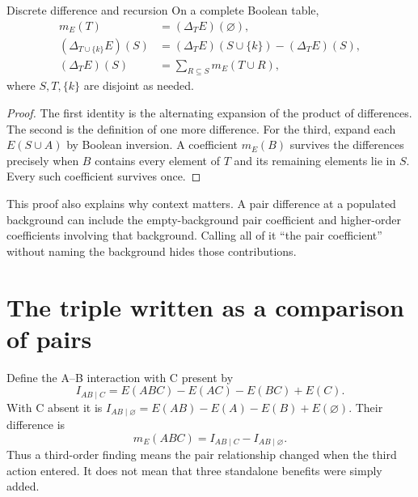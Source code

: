 \begin{theorem}{Discrete difference and recursion}\label{thm:recursion}
On a complete Boolean table,
\begin{align}
 m_E(T)&=(\Delta_TE)(\varnothing),\label{eq:mobius-difference}\\
 (\Delta_{T\cup\{k\}}E)(S)
  &=(\Delta_TE)(S\cup\{k\})-(\Delta_TE)(S),\label{eq:recursion}\\
 (\Delta_TE)(S)&=\sum_{R\subseteq S}m_E(T\cup R),\label{eq:background-dividends}
\end{align}
where $S,T,\{k\}$ are disjoint as needed.
\end{theorem}
\begin{proof}
The first identity is the alternating expansion of the product of differences. The second is the definition of one more difference. For the third, expand each $E(S\cup A)$ by Boolean inversion. A coefficient $m_E(B)$ survives the differences precisely when $B$ contains every element of $T$ and its remaining elements lie in $S$. Every such coefficient survives once.
\end{proof}

This proof also explains why context matters. A pair difference at a populated background can include the empty-background pair coefficient and higher-order coefficients involving that background. Calling all of it ``the pair coefficient'' without naming the background hides those contributions.

\section{The triple written as a comparison of pairs}
Define the A--B interaction with C present by
\begin{equation}
 I_{AB\mid C}=E(ABC)-E(AC)-E(BC)+E(C).
\end{equation}
With C absent it is $I_{AB\mid\varnothing}=E(AB)-E(A)-E(B)+E(\varnothing)$. Their difference is
\begin{equation}\label{eq:triple-recursion}
 m_E(ABC)=I_{AB\mid C}-I_{AB\mid\varnothing}.
\end{equation}
Thus a third-order finding means the pair relationship changed when the third action entered. It does not mean that three standalone benefits were simply added.


